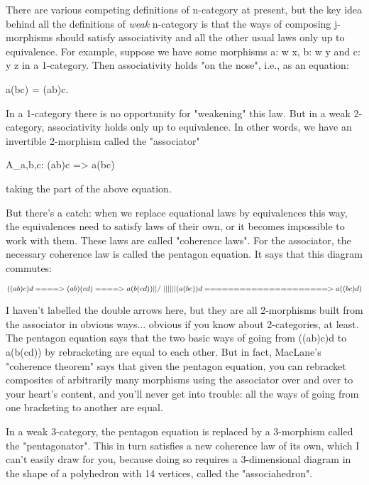 There are various competing definitions of n-category at present, but
the key idea behind all the definitions of \emph{weak} n-category is that the
ways of composing j-morphisms should satisfy associativity and all the
other usual laws only up to equivalence.  For example, suppose we have
some morphisms a: w \to  x, b: w \to  y and c: y \to  z in a
1-category.  Then associativity holds "on the nose", i.e., as
an equation:

a(bc) = (ab)c.

In a 1-category there is no opportunity for "weakening" this
law.  But in a weak 2-category, associativity holds only up to
equivalence.  In other words, we have an invertible 2-morphism called
the "associator"

A_{a,b,c}: (ab)c => a(bc)

taking the part of the above equation.  

But there's a catch: when we replace equational laws by equivalences
this way, the equivalences need to satisfy laws of their own, or it
becomes impossible to work with them.  These laws are called
"coherence laws".  For the associator, the necessary coherence
law is called the pentagon equation.  It says that this diagram
commutes:


$$

               ((ab)c)d  ====>  (ab)(cd)  ====> a(b(cd))

                  ||                              /\
                  ||                              ||
                  \/                              ||

               (a(bc))d  =====================> a((bc)d)
$$
    
I haven't labelled the double arrows here, but they are all 2-morphisms
built from the associator in obvious ways... obvious if you know about
2-categories, at least.  The pentagon equation says that the two basic
ways of going from ((ab)c)d to a(b(cd)) by rebracketing are equal to
each other.  But in fact, MacLane's "coherence theorem" says
that given the pentagon equation, you can rebracket composites of
arbitrarily many morphisms using the associator over and over to your
heart's content, and you'll never get into trouble: all the ways of
going from one bracketing to another are equal.

In a weak 3-category, the pentagon equation is replaced by a 3-morphism
called the "pentagonator".  This in turn satisfies a new coherence
law of its own, which I can't easily draw for you, because doing so 
requires a 3-dimensional diagram in the shape of a polyhedron with 14
vertices, called the "associahedron".  

